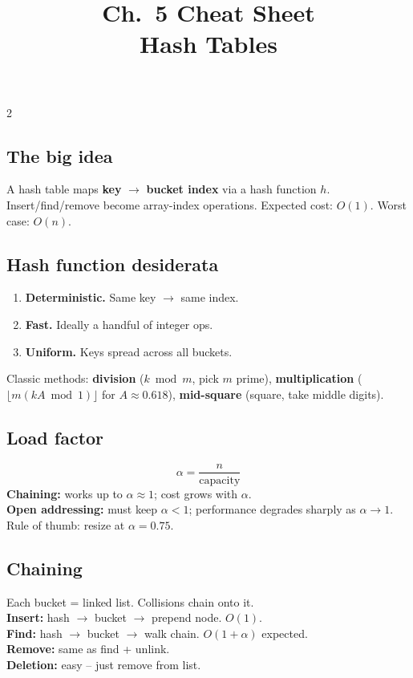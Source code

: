 \documentclass[10pt]{article}
\title{Ch.~5 Cheat Sheet\\\large Hash Tables}
\author{}
\date{}
\begin{document}
\maketitle
\vspace{-2em}

\begin{multicols}{2}

\subsection*{The big idea}
A hash table maps \textbf{key} $\to$ \textbf{bucket index} via a hash
function $h$. Insert/find/remove become array-index operations. Expected
cost: $O(1)$. Worst case: $O(n)$.

\subsection*{Hash function desiderata}
\begin{enumerate}
    \item \textbf{Deterministic.} Same key $\to$ same index.
    \item \textbf{Fast.} Ideally a handful of integer ops.
    \item \textbf{Uniform.} Keys spread across all buckets.
\end{enumerate}
Classic methods: \textbf{division} ($k \bmod m$, pick $m$ prime),
\textbf{multiplication} ($\lfloor m (k A \bmod 1) \rfloor$ for
$A \approx 0.618$), \textbf{mid-square} (square, take middle digits).

\subsection*{Load factor}
\[
\alpha = \frac{n}{\text{capacity}}
\]
\textbf{Chaining:} works up to $\alpha \approx 1$; cost grows with $\alpha$.\\
\textbf{Open addressing:} must keep $\alpha < 1$; performance degrades
sharply as $\alpha \to 1$. Rule of thumb: resize at $\alpha = 0.75$.

\subsection*{Chaining}
Each bucket = linked list. Collisions chain onto it.\\
\textbf{Insert:} hash $\to$ bucket $\to$ prepend node. $O(1)$.\\
\textbf{Find:} hash $\to$ bucket $\to$ walk chain. $O(1 + \alpha)$
expected.\\
\textbf{Remove:} same as find + unlink.\\
\textbf{Deletion:} easy -- just remove from list.


\end{multicols}
\end{document}

